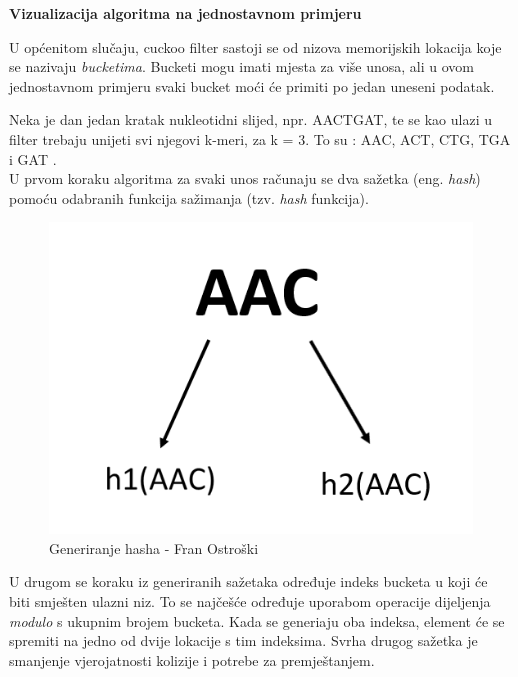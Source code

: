 \documentclass[times, utf8, seminar, numeric]{fer}
\begin{document}
\begin{flushleft}
\textbf{Vizualizacija algoritma na jednostavnom primjeru}
\end{flushleft}


U općenitom slučaju, cuckoo filter sastoji se od nizova memorijskih lokacija koje se nazivaju \textit{bucketima}. Bucketi mogu imati mjesta za više unosa, ali u ovom jednostavnom primjeru svaki bucket moći će primiti  po jedan uneseni podatak.

Neka je dan jedan kratak nukleotidni slijed, npr. AACTGAT, te se kao ulazi u filter trebaju unijeti svi njegovi k-meri, za k = 3. To su : AAC, ACT, CTG, TGA i GAT . \\
U prvom koraku algoritma za svaki unos računaju se dva sažetka (eng. \textit{hash}) pomoću odabranih funkcija sažimanja (tzv. \textit{hash} funkcija).

\begin{figure}[H]
  \centering
  \setlength{\intextsep}{5pt}
  \includegraphics[scale = 0.75]{images/hashing.png}
  \caption{Generiranje hasha - Fran Ostroški}
  \label{fig_hash}
\end{figure}

U drugom se koraku iz generiranih sažetaka određuje indeks bucketa u koji će biti smješten ulazni niz. To se najčešće određuje uporabom operacije dijeljenja \textit{modulo} s ukupnim brojem bucketa. Kada se generiaju oba indeksa, element će se spremiti na jedno od dvije lokacije s tim indeksima. Svrha drugog sažetka je smanjenje vjerojatnosti kolizije i potrebe za premještanjem. 
\end{document}
